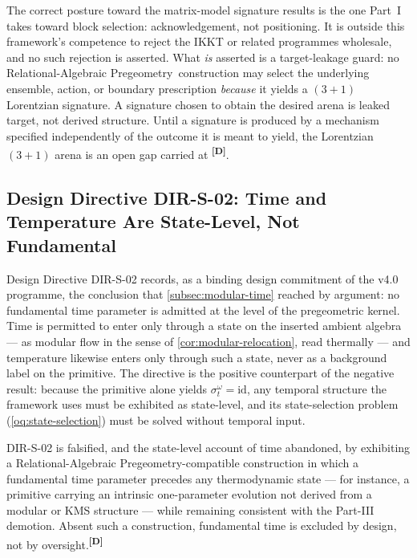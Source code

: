 \documentclass[12pt,a4paper,twoside]{article}
\theoremstyle{plain}
\theoremstyle{definition}
\theoremstyle{remark}
\newcommand{\ProjectShort}{Relational-Algebraic Pregeometry}
\newcommand{\RAP}{\ProjectShort}
\newcommand{\catmark}[1]{\textsuperscript{\textsf{\textbf{[#1]}}}}
\begin{document}
\begin{governancebox}
The correct posture toward the matrix-model signature results is the one
Part~I takes toward block selection: acknowledgement, not positioning. It
is outside this framework's competence to reject the IKKT or related
programmes wholesale, and no such rejection is asserted. What \emph{is}
asserted is a target-leakage guard: no \RAP\ construction may select the
underlying ensemble, action, or boundary prescription \emph{because} it
yields a $(3{+}1)$ Lorentzian signature. A signature chosen to obtain the
desired arena is leaked target, not derived structure. Until a signature is
produced by a mechanism specified independently of the outcome it is meant
to yield, the Lorentzian $(3{+}1)$ arena is an open gap carried at
\catmark{D}.
\end{governancebox}

\subsection{Design Directive DIR-S-02: Time and Temperature Are State-Level, Not Fundamental}
\label{subsec:dir-s-02}

Design Directive DIR-S-02 records, as a binding design commitment of the
v4.0 programme, the conclusion that \cref{subsec:modular-time} reached by
argument: no fundamental time parameter is admitted at the level of the
pregeometric kernel. Time is permitted to enter only through a state on the
inserted ambient algebra --- as modular flow in the sense of
\cref{cor:modular-relocation}, read thermally --- and temperature likewise
enters only through such a state, never as a background label on the
primitive. The directive is the positive counterpart of the negative
result: because the primitive alone yields $\sigma^\omega_t=\mathrm{id}$,
any temporal structure the framework uses must be exhibited as state-level,
and its state-selection problem (\cref{oq:state-selection}) must be solved
without temporal input.

\begin{killswitch}
DIR-S-02 is falsified, and the state-level account of time abandoned, by
exhibiting a \RAP-compatible construction in which a fundamental time
parameter precedes any thermodynamic state --- for instance, a primitive
carrying an intrinsic one-parameter evolution not derived from a modular or
KMS structure --- while remaining consistent with the Part-III demotion.
Absent such a construction, fundamental time is excluded by design, not by
oversight.\catmark{D}
\end{killswitch}
\end{document}
